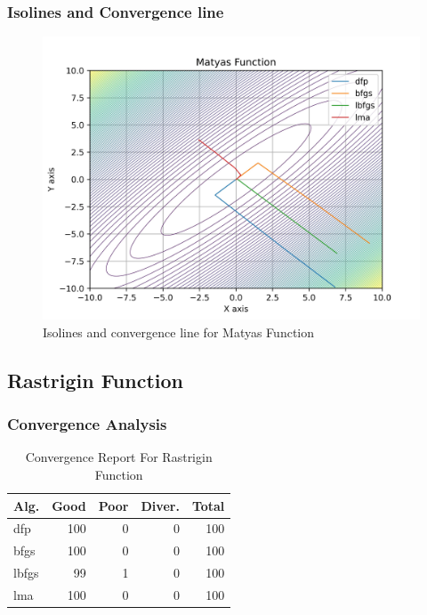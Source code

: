 \documentclass[conference]{IEEEtran}
\begin{document}
\subsubsection{Isolines and Convergence line}
\label{isolinesmatyas2D}

\begin{figure}[H]
\centering
\caption{Isolines and convergence line for Matyas Function}
\label{fig:matyas}
\includegraphics[scale=0.5]{images/matyas.jpg}
\end{figure}
\subsection{Rastrigin Function}
\label{rastrigin2d2D}

\subsubsection{Convergence Analysis}
\label{convergencerastrigin2d2D}

\begin{table}[H]
\centering
\caption{Convergence Report For Rastrigin Function}
\label{convergence:rastrigin2d}
\begin{tabular}{lrrrr}
\toprule
 Alg. &  Good &  Poor &  Diver. &  Total \\
\midrule
  dfp &   100 &     0 &       0 &    100 \\
 bfgs &   100 &     0 &       0 &    100 \\
lbfgs &    99 &     1 &       0 &    100 \\
  lma &   100 &     0 &       0 &    100 \\
\bottomrule
\end{tabular}
\end{table}
\end{document}
